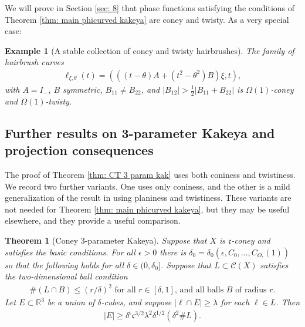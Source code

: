 \documentclass[12pt]{amsart}
\numberwithin{equation}{section}
\newtheorem{theorem}{Theorem}
\newtheorem{example}[lemma]{Example}
\newcommand{\R}{\mathbb{R}}
\newcommand{\1}{\mathbbm{1}}
\begin{document}
We will prove in Section \ref{sec: 8} that phase functions satisfying the conditions of Theorem \ref{thm: main phicurved kakeya} are coney and twisty. As a very special case: 

\begin{example}[A stable collection of coney and twisty hairbrushes]
    The family of hairbrush curves 
    \begin{align}
        \ell_{\xi,\theta}(t) = (((t -\theta)A +(t^2 - \theta^2)B)\xi, t),
    \end{align}
    with $A = I_-$, $B$ symmetric, $B_{11} \neq B_{22}$, and $|B_{12}| > \frac{1}{2} |B_{11} + B_{22}|$
    is $\Omega(1)$-coney and $\Omega(1)$-twisty. 
\end{example}


\subsection{Further results on 3-parameter Kakeya and projection consequences}\label{subsec: further results}

The proof of Theorem \ref{thm: CT 3 param kak} uses both coniness and twistiness. We record two further variants. One uses only coniness, and the other is a mild generalization of the result in \cite{KWZ} using planiness and twistiness. These variants are not needed for Theorem \ref{thm: main phicurved kakeya}, but they may be useful elsewhere, and they provide a useful comparison.


\begin{theorem}[Coney 3-parameter Kakeya]\label{thm: C 3 param kak}
    Suppose that $X$ is $\mathfrak c$-coney and satisfies the basic conditions. For all $\epsilon > 0$ there is $\delta_0 = \delta_0(\epsilon, C_0,\ldots, C_{O_\epsilon}(1))$ so that the following holds for all $\delta \in (0,\delta_0]$. Suppose that $L \subset \mathcal C(X)$ satisfies the two-dimensional ball condition 
    \begin{align}
        \# (L \cap B) \leq (r/ \delta)^2 \text{ for all $r \in [\delta, 1]$, and all balls $B$ of radius $r$.}
    \end{align}
    Let $E \subset \R^3$ be a union of $\delta$-cubes, and suppose $|\ell \cap E| \geq \lambda$ for each $\ell \in L$. Then 
    \begin{align}
        |E| \geq \delta^\epsilon \mathfrak c^{3/2} \lambda^2 \delta^{1/2} (\delta^2 \#L). 
    \end{align}
\end{theorem}
\end{document}
